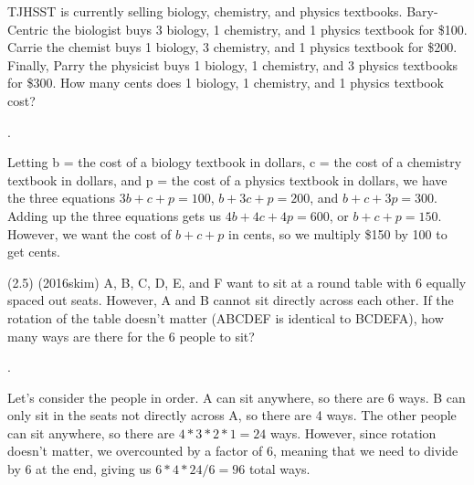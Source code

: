 \documentclass[11pt]{article}
\begin{document}
\begin{problem}
TJHSST is currently selling biology, chemistry, and physics textbooks. Bary-Centric the biologist buys 3 biology, 1 chemistry, and 1 physics textbook for \$100. Carrie the chemist buys 1 biology, 3 chemistry, and 1 physics textbook for \$200. Finally, Parry the physicist buys 1 biology, 1 chemistry, and 3 physics textbooks for \$300. How many cents does 1 biology, 1 chemistry, and 1 physics textbook cost?
\end{problem}

\begin{answer}
.
\end{answer}

\begin{solution}
Letting b = the cost of a biology textbook in dollars, c = the cost of a chemistry textbook in dollars, and p = the cost of a physics textbook in dollars, we have the three equations $3b + c + p = 100$, $b + 3c + p = 200$, and $b + c + 3p = 300$. Adding up the three equations gets us $4b + 4c + 4p = 600$, or $b + c + p = 150$. However, we want the cost of $b + c + p$ in cents, so we multiply \$150 by 100 to get  cents.
\end{solution}

\begin{problem}
(2.5) (2016skim) A, B, C, D, E, and F want to sit at a round table with 6 equally spaced out seats. However, A and B cannot sit directly across each other. If the rotation of the table doesn't matter (ABCDEF is identical to BCDEFA), how many ways are there for the 6 people to sit?
\end{problem}

\begin{answer}
.
\end{answer}

\begin{solution}
Let's consider the people in order. A can sit anywhere, so there are 6 ways. B can only sit in the seats not directly across A, so there are 4 ways. The other people can sit anywhere, so there are $4*3*2*1 = 24$ ways. However, since rotation doesn't matter, we overcounted by a factor of $6$, meaning that we need to divide by $6$ at the end, giving us $6*4*24/6 = 96$ total ways.
\end{solution}
\end{document}
